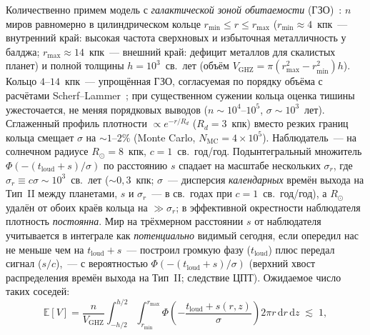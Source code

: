 \documentclass[12pt,a4paper]{article}
\begin{document}
Количественно примем модель с \emph{галактической зоной обитаемости} (ГЗО)~\cite{Lineweaver2001,Scherf2024}: $n$ миров равномерно в цилиндрическом кольце $r_{\min}\le r\le r_{\max}$ ($r_{\min}\approx4$~кпк~--- внутренний край: высокая частота сверхновых и избыточная металличность у балджа; $r_{\max}\approx14$~кпк~--- внешний край: дефицит металлов для скалистых планет) и полной толщины $h = 10^3$~св.~лет (объём $V_{\mathrm{GHZ}} = \pi(r_{\max}^2-r_{\min}^2)h$). Кольцо $4$--$14$~кпк~--- упрощённая ГЗО, согласуемая по порядку объёма с расчётами Scherf--Lammer~\cite{Scherf2024}; при существенном сужении кольца оценка тишины ужесточается, не меняя порядковых выводов ($n\sim10^4$--$10^5$, $\sigma\sim10^3$~лет). Сглаженный профиль плотности $\propto e^{-r/R_d}$ ($R_d=3$~кпк) вместо резких границ кольца смещает $\sigma$ на $\sim1$--$2\%$ (Monte Carlo, $N_{\mathrm{MC}}=4\times10^5$). Наблюдатель~--- на солнечном радиусе $R_\odot=8$~кпк, $c = 1$~св.~год/год. Подынтегральный множитель $\Phi(-(t_{\mathrm{loud}}+s)/\sigma)$ по расстоянию $s$ спадает на масштабе нескольких $\sigma_r$, где $\sigma_r\equiv c\sigma\sim10^3$~св.~лет ($\sim0{,}3$~кпк; $\sigma$~--- дисперсия \emph{календарных} времён выхода на Тип~II между планетами, $s$ и $\sigma_r$~--- в св.~годах при $c=1$~св.~год/год), а $R_\odot$ удалён от обоих краёв кольца на $\gg\sigma_r$; в эффективной окрестности наблюдателя плотность \emph{постоянна}. Мир на трёхмерном расстоянии $s$ от наблюдателя учитывается в интеграле как \emph{потенциально} видимый сегодня, если опередил нас не меньше чем на $t_{\mathrm{loud}} + s$~--- построил громкую фазу ($t_{\mathrm{loud}}$) плюс передал сигнал ($s/c$),~--- с вероятностью $\Phi(-(t_{\mathrm{loud}}+s)/\sigma)$ (верхний хвост распределения времён выхода на Тип~II; следствие ЦПТ). Ожидаемое число таких соседей:
\begin{equation}
\boxed{\;\mathbb{E}[V] = \frac{n}{V_{\mathrm{GHZ}}}\int_{-h/2}^{h/2}\!\!\int_{r_{\min}}^{r_{\max}} \Phi\!\left(-\frac{t_{\mathrm{loud}}+s(r,z)}{\sigma}\right) 2\pi r\,\mathrm{d}r\,\mathrm{d}z \;\lesssim\; 1,\;}
\end{equation}
\end{document}
